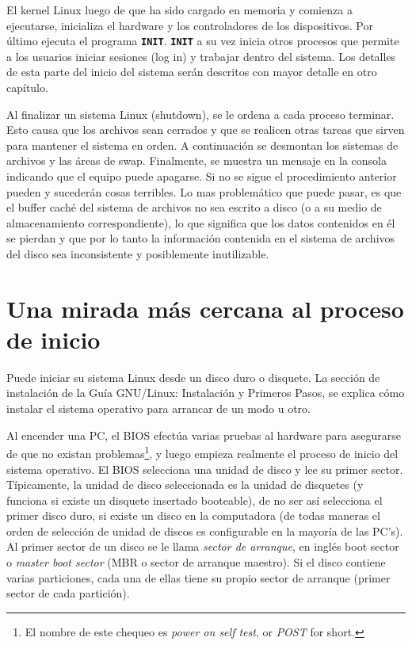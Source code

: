 \documentclass[12pt]{article}
\begin{document}
 El kernel Linux luego de que ha sido cargado en memoria y comienza a
ejecutarse, inicializa el hardware y los controladores de los dispositivos. Por
último ejecuta el programa \texttt{\textbf{INIT}}. \texttt{\textbf{INIT}} a su
vez inicia otros procesos que permite a los usuarios iniciar sesiones (log in) y
trabajar dentro del sistema. Los detalles de esta parte del inicio del sistema
serán descritos con mayor detalle en otro capítulo.  

 Al finalizar un sistema Linux (shutdown), se le ordena a cada proceso
terminar. Esto causa que los archivos sean cerrados y que se realicen otras
tareas que sirven para mantener el sistema en orden. A continuación se desmontan
los sistemas de archivos y las áreas de swap. Finalmente, se muestra un mensaje
en la consola indicando que el equipo puede apagarse. Si no se sigue el
procedimiento anterior pueden y sucederán cosas terribles. Lo mas problemático
que puede pasar, es que el buffer caché del sistema de archivos no sea escrito a
disco (o a su medio de almacenamiento correspondiente), lo que significa que los
datos contenidos en él se pierdan y que por lo tanto la información contenida en
el sistema de archivos del disco sea inconsistente y posiblemente inutilizable.
 


\section{ Una mirada más cercana al proceso de inicio}

 Puede iniciar su sistema Linux desde un disco duro o disquete. La sección
de instalación de la Guía GNU/Linux: Instalación y Primeros Pasos, se explica
cómo instalar el sistema operativo para arrancar de un modo u otro.  



 Al encender una PC, el BIOS efectúa varias pruebas al hardware para
asegurarse de que no existan problemas\footnote{El nombre de este chequeo es
\textit{power on self test}, or \textit{POST} for
short.}, y luego empieza realmente el proceso de inicio del sistema operativo. El BIOS
selecciona una unidad de disco y lee su primer sector. Típicamente, la unidad de
disco seleccionada es la unidad de disquetes (y funciona si existe un disquete
insertado booteable), de no ser así selecciona el primer disco duro, si existe
un disco en la computadora (de todas maneras el orden de selección de unidad de
discos es configurable en la mayoría de las PC's). Al primer sector de un disco
se le llama \textit{sector de arranque}, en inglés boot sector o
\textit{master boot sector} (MBR o sector de arranque maestro). Si
el disco contiene varias particiones, cada una de ellas tiene su propio sector
de arranque (primer sector de cada partición).  
\end{document}
